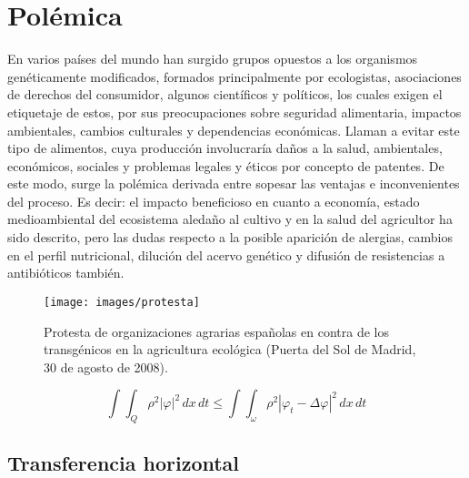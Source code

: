 \documentclass[11pt,a4paper]{article}
\begin{document}
\section{Polémica}\label{seccion.polemica}




En varios países del mundo han surgido grupos opuestos a los organismos genéticamente modificados, formados principalmente por ecologistas, asociaciones de derechos del consumidor, algunos científicos y políticos, los cuales exigen el etiquetaje de estos, por sus preocupaciones sobre seguridad alimentaria, impactos ambientales, cambios culturales y dependencias económicas. Llaman a evitar este tipo de alimentos, cuya producción involucraría daños a la salud, ambientales, económicos, sociales y problemas legales y éticos por concepto de patentes.
De este modo, surge la polémica derivada entre sopesar las ventajas e inconvenientes del proceso. Es decir: el impacto beneficioso en cuanto a economía, 
estado medioambiental del ecosistema aledaño al cultivo 
y en la salud del agricultor ha sido descrito, \cite{kim}
pero las dudas respecto a la posible aparición de alergias, 
cambios en el perfil nutricional, dilución del acervo genético y difusión de resistencias a antibióticos también.



\begin{figure}[h]
\centering
\texttt{[image: images/protesta]}
\caption[Manifestación pro agricultura ecológica]{Protesta de organizaciones agrarias españolas en contra de los transgénicos en la agricultura ecológica (Puerta del Sol de Madrid, 30 de agosto de 2008).}
\label{protesta}
\end{figure}


\begin{equation}\label{eq3}
\int\!\!\!\int_Q\rho^2|\varphi|^2\,dx\,dt
\le
\int\!\!\!\int_\omega\rho^2|\varphi_t-\Delta\varphi|^2\,dx\,dt
\end{equation}

\subsection{Transferencia horizontal}
\end{document}

